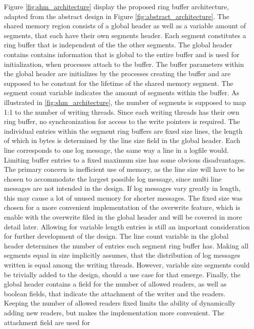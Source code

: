 Figure \ref{fig:shm_architecture} display the proposed ring buffer architecture, adapted from the abstract design in Figure \ref{fig:abstract_architecture}.
The shared memory region consists of a global header as well as a variable amount of segments,
that each have their own segments header. Each segment constitutes a ring buffer that is independent of the
the other segments. The global header contains contains information that is global to
the entire buffer and is used for initialization, when processes attach to the buffer. The buffer parameters within the global
header are initializes by the processes creating the buffer and are supposed to be constant for the lifetime of the shared memory segment.
The segment count variable indicates the amount of segments within the buffer. As illustrated
in \ref{fig:shm_architecture}, the number of segments is supposed to map 1:1 to the number 
of writing threads. Since each writing threads has their own ring buffer, no synchronization for access
to the write pointers is required. The individual entries within the segment ring buffers are fixed
size lines, the length of which in bytes is determined by the line size field in the global header. Each line corresponds
to one log message, the same way a line in a logfile would.  
Limiting buffer entries to a fixed maximum size has some obvious disadvantages. The primary concern
is inefficient use of memory, as the line size will have to be chosen to accommodate the largest possible log message, since multi line
messages are not intended in the design. If log messages vary greatly in length, this may cause a lot of unused memory
for shorter messages. The fixed size was chosen for a more convenient implementation of the overwrite feature, which is enable with the overwrite filed in the global header and will be covered in more detail
later. Allowing for variable length entries is still an important consideration for further development of the design. The line count variable in the global header 
determines the number of entries each segment ring buffer has. Making all segments equal in size implicitly assumes, that the distribution of log messages written
is equal among the writing threads. However, variable size segments could be trivially added to the design, should a use case for that emerge. 
Finally, the global header contains a field for the number of allowed readers, as well as boolean fields, that indicate the attachment of the writer and the readers.
Keeping the number of allowed readers fixed limits the ability of dynamically adding new readers, but makes the implementation more convenient. The attachment field are used for
